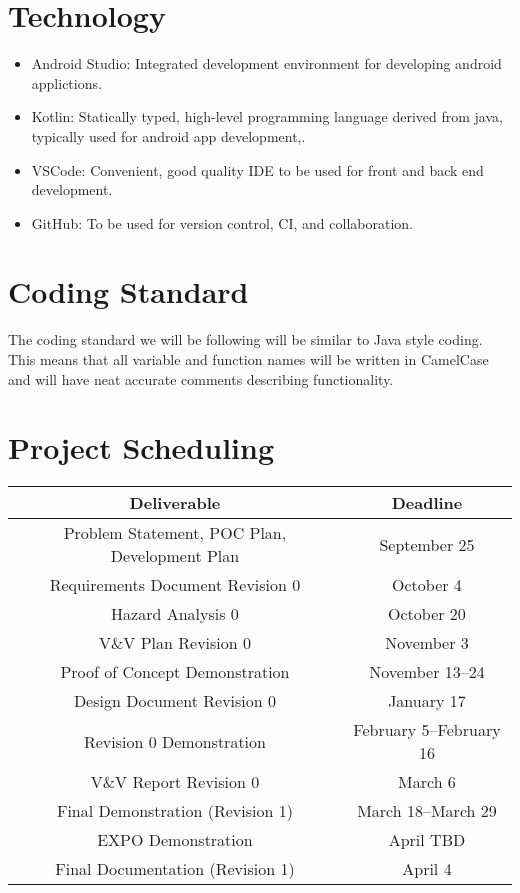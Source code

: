 \documentclass{article}
\begin{document}

\section{Technology}

\begin{itemize}
\item Android Studio: Integrated development environment for developing android applictions.
\item Kotlin: Statically typed, high-level programming language derived from java, typically used for android app development,.
\item VSCode: Convenient, good quality IDE to be used for front and back end development.
\item GitHub: To be used for version control, CI, and collaboration.

\end{itemize}

\section{Coding Standard}

The coding standard we will be following will be similar to Java style coding. This means that all variable and function names will be written in CamelCase and will have neat accurate comments describing functionality. 

\section{Project Scheduling}

\begin{center}
\begin{tabular}{ |c|c| } 
\hline
\textbf{Deliverable} & \textbf{Deadline} \\ 
 \hline
 Problem Statement, POC Plan, Development Plan & September 25 \\ 
 Requirements Document Revision 0  & October 4 \\
Hazard Analysis 0 & October 20  \\ 
 V\&V Plan Revision 0 & November 3 \\ 
Proof of Concept Demonstration & November 13--24 \\
Design Document Revision 0 & January 17 \\
Revision 0 Demonstration & February 5--February 16\\
V\&V Report Revision 0 & March 6 \\
Final Demonstration (Revision 1) & March 18--March 29 \\
EXPO Demonstration & April TBD \\
Final Documentation (Revision 1) & April 4 \\
 \hline
\end{tabular}
\end{center}

\end{document}
